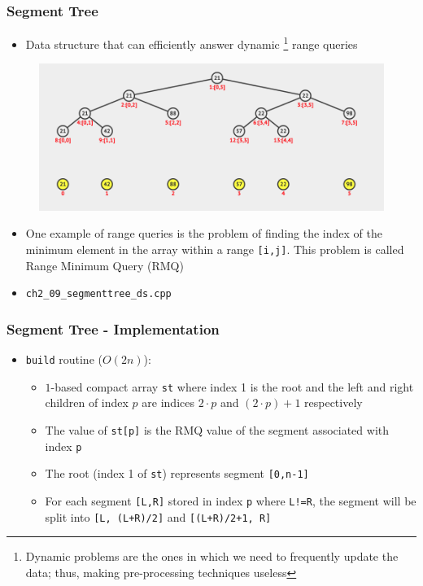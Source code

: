 \documentclass{beamer}
\begin{document}
\begin{frame}[fragile]
\frametitle{Segment Tree}
	\begin{itemize}
	    \item Data structure that can efficiently answer dynamic \footnote{Dynamic problems are the ones in which we need to frequently update the data; thus, making pre-processing techniques useless} range queries
	\end{itemize}
	\begin{figure}
	    \centering
	    \includegraphics[scale=0.15]{imgs/2.4/segment-tree/segment-tree.png}
	\end{figure}
	\begin{itemize}
	    \item One example of range queries is the problem of finding the index of the minimum element in the array within a range \verb|[i,j]|. This problem is called Range Minimum Query (RMQ)
	    \item \color{red}\verb|ch2_09_segmenttree_ds.cpp|\color{black}
	\end{itemize}
\end{frame}

\begin{frame}[fragile]
\frametitle{Segment Tree - Implementation}
	\begin{itemize}
		\item \verb|build| routine ($O(2n)$):
			\begin{itemize}
	    		\item $1$-based compact array \verb|st| where index 1 is the root and the left and right children of index $p$ are indices $2\cdot p$ and $(2\cdot p)+1$ respectively
			    \item The value of \verb|st[p]| is the RMQ value of the segment associated with index \verb|p|
	    		\item The root (index 1 of \verb|st|) represents segment \verb|[0,n-1]|
			    \item For each segment \verb|[L,R]| stored in index \verb|p| where \verb|L!=R|, the segment will be split into \verb|[L, (L+R)/2]| and \verb|[(L+R)/2+1, R]|
			\end{itemize}
	\end{itemize}
\end{frame}
\end{document}
